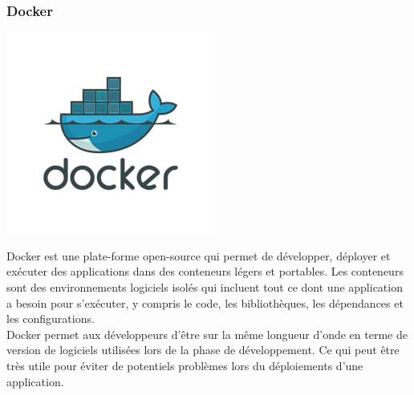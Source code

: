 		\subsubsection{Docker}
			\begin{center}
				\includegraphics[scale=1]{chap_3/docker.jpg}
				\label{Docker}
				\cite{docker_image}
			\end{center}
		Docker est une plate-forme open-source qui permet de développer, déployer et exécuter des applications dans des conteneurs légers et portables. Les conteneurs sont des environnements logiciels isolés qui incluent tout ce dont une application a besoin pour s'exécuter, y compris le code, les bibliothèques, les dépendances et les configurations.\\
		Docker permet aux développeurs d'être sur la même longueur d'onde en terme de version de logiciels utilisées lors de la phase de développement. Ce qui peut être très utile pour éviter de potentiels problèmes lors du déploiements d'une application.
		
		
